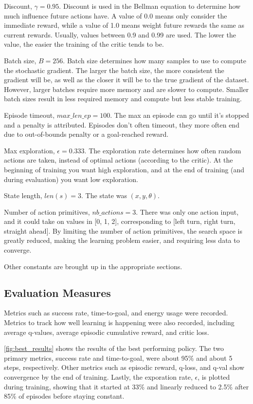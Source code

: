 \documentclass[11pt]{article}
\begin{document}
Discount, $\gamma = 0.95$. Discount is used in the Bellman equation to determine how much influence future actions have. A value of 0.0 means only consider the immediate reward, while a value of 1.0 means weight future rewards the same as current rewards. Usually, values between 0.9 and 0.99 are used. The lower the value, the easier the training of the critic tends to be.

Batch size, $B = 256$. Batch size determines how many samples to use to compute the stochastic gradient. The larger the batch size, the more consistent the gradient will be, as well as the closer it will be to the true gradient of the dataset. However, larger batches require more memory and are slower to compute. Smaller batch sizes result in less required memory and compute but less stable training.

Episode timeout, $max\_len\_ep = 100$. The max an episode can go until it's stopped and a penalty is attributed. Episodes don't often timeout, they more often end due to out-of-bounds penalty or a goal-reached reward.

Max exploration, $\epsilon = 0.333$. The exploration rate determines how often random actions are taken, instead of optimal actions (according to the critic). At the beginning of training you want high exploration, and at the end of training (and during evaluation) you want low exploration.

State length, $len(s) = 3$. The state was $(x, y, \theta)$.

Number of action primitives, $nb\_actions = 3$. There was only one action input, and it could take on values in [0, 1, 2], corresponding to [left turn, right turn, straight ahead]. By limiting the number of action primitives, the search space is greatly reduced, making the learning problem easier, and requiring less data to converge.

Other constants are brought up in the appropriate sections.


\subsection{Evaluation Measures}

Metrics such as success rate, time-to-goal, and energy usage were recorded.  Metrics to track how well learning is happening were also recorded, including average q-values, average episodic cumulative reward, and critic loss.

\cref{fig:best_results} shows the results of the best performing policy. The two primary metrics, success rate and time-to-goal, were about 95\% and about 5 steps, respectively. Other metrics such as episodic reward, q-loss, and q-val show convergence by the end of training. Lastly, the exporation rate, $\epsilon$, is plotted during training, showing that it started at 33\% and linearly reduced to 2.5\% after 85\% of episodes before staying constant.
\end{document}
